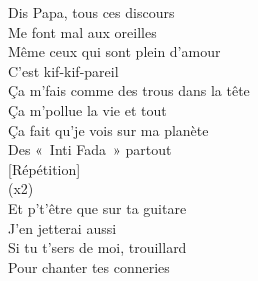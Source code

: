 \documentclass{novel}
\begin{document}
\begin{multicols}{2}
Dis Papa, tous ces discours \\
Me font mal aux oreilles \\
Même ceux qui sont plein d'amour \\
C'est kif-kif-pareil \\
Ça m'fais comme des trous dans la tête \\
Ça m'pollue la vie et tout \\
Ça fait qu'je vois sur ma planète \\
Des «~Inti Fada~» partout \\

[Répétition] \\

(x2) \\
Et p't'être que sur ta guitare \\
J'en jetterai aussi \\
Si tu t'sers de moi, trouillard \\
Pour chanter tes conneries \\
\end{multicols}
\end{document}
